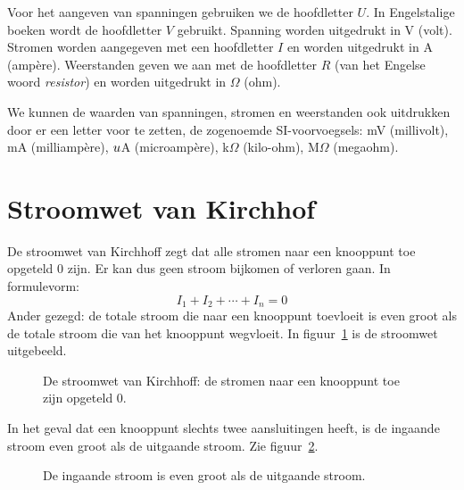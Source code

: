 Voor het aangeven van spanningen gebruiken we de hoofdletter $U$. In Engelstalige boeken
wordt de hoofdletter $V$ gebruikt. Spanning worden uitgedrukt in V (volt). Stromen worden
aangegeven met een hoofdletter $I$ en worden uitgedrukt in A (amp\`ere). Weerstanden
geven we aan met de hoofdletter $R$ (van het Engelse woord \textsl{resistor}) en worden
uitgedrukt in $\Omega$ (ohm).

We kunnen de waarden van spanningen, stromen en weerstanden ook uitdrukken door er een
letter voor te zetten, de zogenoemde SI-voorvoegsels: mV (millivolt), mA (milliamp\`ere),
$u$A (microamp\`ere), k$\Omega$ (kilo-ohm), M$\Omega$ (megaohm).

\section{Stroomwet van Kirchhof}
De stroomwet van Kirchhoff zegt dat alle stromen naar een knooppunt toe opgeteld 0 zijn.
Er kan dus geen stroom bijkomen of verloren gaan. In formulevorm:
\begin{equation}
I_1 + I_2 + \cdots + I_n = 0
\end{equation}
Ander gezegd: de totale stroom die naar een knooppunt toevloeit is even groot als de
totale stroom die van het knooppunt wegvloeit. In figuur~\ref{fig:gelstroomwetKirchhoff}
is de stroomwet uitgebeeld.

\begin{figure}[!ht]
\centering
{}
\caption{De stroomwet van Kirchhoff: de stromen naar een knooppunt toe zijn opgeteld 0.}
\label{fig:gelstroomwetKirchhoff}
\end{figure}

In het geval dat een knooppunt slechts twee aansluitingen heeft, is de ingaande stroom even groot als de
uitgaande stroom. Zie figuur~\ref{fig:gelingaandeIisuitgaandeI}.

\begin{figure}[!ht]
\centering
{}
\caption{De ingaande stroom is even groot als de uitgaande stroom.}
\label{fig:gelingaandeIisuitgaandeI}
\end{figure}



